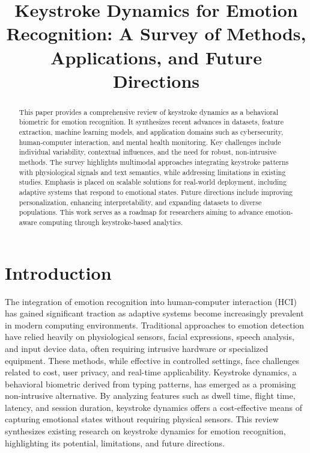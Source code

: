\documentclass[conference]{IEEEtran}
\begin{document}
\title{Keystroke Dynamics for Emotion Recognition: A Survey of Methods, Applications, and Future Directions}

\author{
}

\maketitle

\begin{abstract}
This paper provides a comprehensive review of keystroke dynamics as a behavioral biometric for emotion recognition. It synthesizes recent advances in datasets, feature extraction, machine learning models, and application domains such as cybersecurity, human-computer interaction, and mental health monitoring. Key challenges include individual variability, contextual influences, and the need for robust, non-intrusive methods. The survey highlights multimodal approaches integrating keystroke patterns with physiological signals and text semantics, while addressing limitations in existing studies. Emphasis is placed on scalable solutions for real-world deployment, including adaptive systems that respond to emotional states. Future directions include improving personalization, enhancing interpretability, and expanding datasets to diverse populations. This work serves as a roadmap for researchers aiming to advance emotion-aware computing through keystroke-based analytics.
\end{abstract}

\begin{IEEEkeywords}
\end{IEEEkeywords}


\section{Introduction}

The integration of emotion recognition into human-computer interaction (HCI) has gained significant traction as adaptive systems become increasingly prevalent in modern computing environments. Traditional approaches to emotion detection have relied heavily on physiological sensors, facial expressions, speech analysis, and input device data, often requiring intrusive hardware or specialized equipment. These methods, while effective in controlled settings, face challenges related to cost, user privacy, and real-time applicability. Keystroke dynamics, a behavioral biometric derived from typing patterns, has emerged as a promising non-intrusive alternative. By analyzing features such as dwell time, flight time, latency, and session duration, keystroke dynamics offers a cost-effective means of capturing emotional states without requiring physical sensors. This review synthesizes existing research on keystroke dynamics for emotion recognition, highlighting its potential, limitations, and future directions.  
\end{document}
